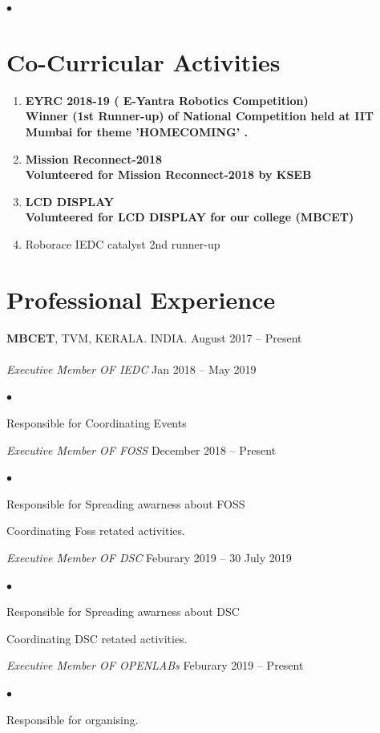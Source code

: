 \documentclass[margin,line]{res}
\newenvironment{list2}{
	\begin{list}{$\bullet$}{%
			\setlength{\itemsep}{0in}
			\setlength{\parsep}{0in} \setlength{\parskip}{0in}
			\setlength{\topsep}{0in} \setlength{\partopsep}{0in}
			\setlength{\leftmargin}{0.2in}}}{\end{list}}
\begin{document}
\begin{resume}
\begin{list2}
\end{list2}
\section{\sc Co-Curricular Activities}
\begin{enumerate} %
	\item \bf EYRC 2018-19 ( E-Yantra Robotics Competition) \\
	Winner (1st Runner-up) of National Competition held at IIT Mumbai for theme 'HOMECOMING' . \\
	\item \bf Mission Reconnect-2018\\
	Volunteered for Mission Reconnect-2018 by KSEB 
	\item \bf LCD DISPLAY   \\
	Volunteered for LCD DISPLAY for our college (MBCET)
	\item Roborace IEDC catalyst 2nd runner-up\\
	
\end{enumerate}
\section{\sc Professional Experience}
{\bf MBCET}, TVM, KERALA. INDIA. \hfill{August 2017 -- Present}\\
\\
{\em Executive Member  OF IEDC }\hfill {Jan 2018 -- May 2019}\\
\begin{list2} %
	\item Responsible for Coordinating Events  \\
\end{list2}
{\em Executive Member  OF FOSS }\hfill {December 2018 -- Present}\\
\begin{list2} %
	\item Responsible for Spreading awarness about FOSS  \\
	\item Coordinating Foss retated activities.
\end{list2}

{\em Executive Member  OF DSC }\hfill {Feburary 2019 -- 30 July 2019}\\
\begin{list2} %
	\item Responsible for Spreading awarness about DSC  \\
	\item Coordinating DSC retated activities.
\end{list2}
{\em Executive Member  OF OPENLABs }\hfill {Feburary 2019 -- Present}\\
\begin{list2} %
	\item Responsible for organising.   \\
	

\end{list2}
\end{resume}
\end{document}
